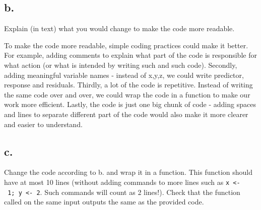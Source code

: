 \documentclass[
]{article}
\begin{document}
\subsection{b.}\label{b.-4}

Explain (in text) what you would change to make the code more readable.

To make the code more readable, simple coding practices could make it
better. For example, adding comments to explain what part of the code is
responsible for what action (or what is intended by writing such and
such code). Secondly, adding meaningful variable names - instead of
x,y,z, we could write predictor, response and residuals. Thirdly, a lot
of the code is repetitive. Instead of writing the same code over and
over, we could wrap the code in a function to make our work more
efficient. Lastly, the code is just one big chunk of code - adding
spaces and lines to separate different part of the code would also make
it more clearer and easier to understand.

\subsection{c.}\label{c.-4}

Change the code according to b. and wrap it in a function. This function
should have at most 10 lines (without adding commands to more lines such
as \texttt{x\ \textless{}-\ 1;\ y\ \textless{}-\ 2}. Such commands will
count as 2 lines!). Check that the function called on the same input
outputs the same as the provided code.
\end{document}
